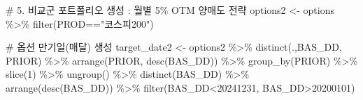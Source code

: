 \documentclass[
  a4paper,
  DIV=11,
  numbers=noendperiod]{scrreprt}
\newenvironment{Shaded}{\begin{snugshade}}{\end{snugshade}}
\newcommand{\CommentTok}[1]{\textcolor[rgb]{0.37,0.37,0.37}{#1}}
\newcommand{\DecValTok}[1]{\textcolor[rgb]{0.68,0.00,0.00}{#1}}
\newcommand{\FunctionTok}[1]{\textcolor[rgb]{0.28,0.35,0.67}{#1}}
\newcommand{\NormalTok}[1]{\textcolor[rgb]{0.00,0.23,0.31}{#1}}
\newcommand{\OtherTok}[1]{\textcolor[rgb]{0.00,0.23,0.31}{#1}}
\newcommand{\SpecialCharTok}[1]{\textcolor[rgb]{0.37,0.37,0.37}{#1}}
\newcommand{\StringTok}[1]{\textcolor[rgb]{0.13,0.47,0.30}{#1}}
\begin{document}
\begin{Shaded}
\begin{Highlighting}[]
\CommentTok{\# 5. 비교군 포트폴리오 생성 : 월별 5\% OTM 양매도 전략}
\NormalTok{options2 }\OtherTok{\textless{}{-}}\NormalTok{ options }\SpecialCharTok{\%\textgreater{}\%} 
  \FunctionTok{filter}\NormalTok{(PROD}\SpecialCharTok{==}\StringTok{"코스피200"}\NormalTok{)}

\CommentTok{\# 옵션 만기일(매달) 생성}
\NormalTok{target\_date2 }\OtherTok{\textless{}{-}}\NormalTok{ options2 }\SpecialCharTok{\%\textgreater{}\%} 
  \FunctionTok{distinct}\NormalTok{(.,BAS\_DD, PRIOR) }\SpecialCharTok{\%\textgreater{}\%} 
  \FunctionTok{arrange}\NormalTok{(PRIOR, }\FunctionTok{desc}\NormalTok{(BAS\_DD)) }\SpecialCharTok{\%\textgreater{}\%} 
  \FunctionTok{group\_by}\NormalTok{(PRIOR) }\SpecialCharTok{\%\textgreater{}\%} 
  \FunctionTok{slice}\NormalTok{(}\DecValTok{1}\NormalTok{) }\SpecialCharTok{\%\textgreater{}\%} 
  \FunctionTok{ungroup}\NormalTok{() }\SpecialCharTok{\%\textgreater{}\%} 
  \FunctionTok{distinct}\NormalTok{(BAS\_DD) }\SpecialCharTok{\%\textgreater{}\%} 
  \FunctionTok{arrange}\NormalTok{(}\FunctionTok{desc}\NormalTok{(BAS\_DD)) }\SpecialCharTok{\%\textgreater{}\%} 
  \FunctionTok{filter}\NormalTok{(BAS\_DD}\SpecialCharTok{\textless{}}\DecValTok{20241231}\NormalTok{, BAS\_DD}\SpecialCharTok{\textgreater{}}\DecValTok{20200101}\NormalTok{)}


\end{Highlighting}
\end{Shaded}
\end{document}
